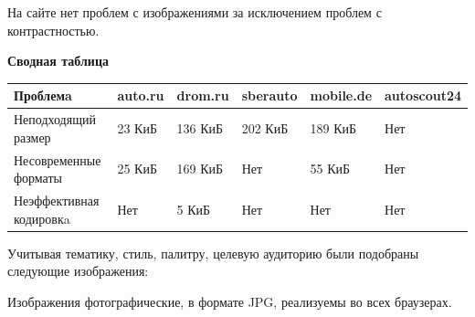 На сайте нет проблем с изображениями за исключением проблем с контрастностью.
\bigskip

\textbf{Сводная таблица}

\begin{table}[H]
    \small
\begin{tabular}{|l|l|l|l|l|l|}
\hline
    \textbf{Проблемa} & \textbf{auto.ru} & \textbf{drom.ru} & \textbf{sberauto} & \textbf{mobile.de} & \textbf{autoscout24} \\
\hline
    Неподходящий размер & 23 КиБ & 136 КиБ & 202 КиБ & 189 КиБ & Нет \\
\hline
    Несовременные форматы & 25 КиБ & 169 КиБ & Нет & 55 КиБ & Нет\\
\hline
    Неэффективная кодировкa & Нет & 5 КиБ & Нет & Нет & Нет\\
\hline
\end{tabular}
\end{table}

Учитывая тематику, стиль, палитру, целевую аудиторию были подобраны следующие изображения:

\noindent
\begin{minipage}{\linewidth}
\end{minipage}
\bigskip

\noindent
\begin{minipage}{\linewidth}
\end{minipage}
\bigskip

Изображения фотографические, в формате JPG, реализуемы во всех браузерах.

